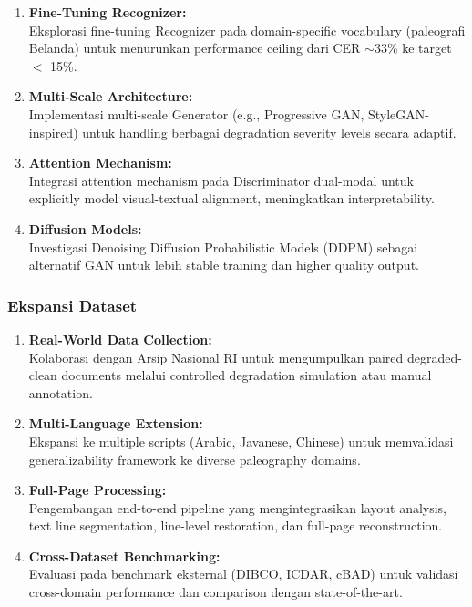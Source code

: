 \documentclass[12pt,a4paper]{article}
\begin{document}
\begin{enumerate}[label=\arabic*., leftmargin=0.5cm]
    \item \textbf{Fine-Tuning Recognizer:} \\
    Eksplorasi fine-tuning Recognizer pada domain-specific vocabulary (paleografi Belanda) untuk menurunkan performance ceiling dari CER $\sim$33\% ke target $<$ 15\%.
    
    \item \textbf{Multi-Scale Architecture:} \\
    Implementasi multi-scale Generator (e.g., Progressive GAN, StyleGAN-inspired) untuk handling berbagai degradation severity levels secara adaptif.
    
    \item \textbf{Attention Mechanism:} \\
    Integrasi attention mechanism pada Discriminator dual-modal untuk explicitly model visual-textual alignment, meningkatkan interpretability.
    
    \item \textbf{Diffusion Models:} \\
    Investigasi Denoising Diffusion Probabilistic Models (DDPM) sebagai alternatif GAN untuk lebih stable training dan higher quality output.
\end{enumerate}

\subsubsection{Ekspansi Dataset}

\begin{enumerate}[label=\arabic*., leftmargin=0.5cm]
    \item \textbf{Real-World Data Collection:} \\
    Kolaborasi dengan Arsip Nasional RI untuk mengumpulkan paired degraded-clean documents melalui controlled degradation simulation atau manual annotation.
    
    \item \textbf{Multi-Language Extension:} \\
    Ekspansi ke multiple scripts (Arabic, Javanese, Chinese) untuk memvalidasi generalizability framework ke diverse paleography domains.
    
    \item \textbf{Full-Page Processing:} \\
    Pengembangan end-to-end pipeline yang mengintegrasikan layout analysis, text line segmentation, line-level restoration, dan full-page reconstruction.
    
    \item \textbf{Cross-Dataset Benchmarking:} \\
    Evaluasi pada benchmark eksternal (DIBCO, ICDAR, cBAD) untuk validasi cross-domain performance dan comparison dengan state-of-the-art.
\end{enumerate}
\end{document}
